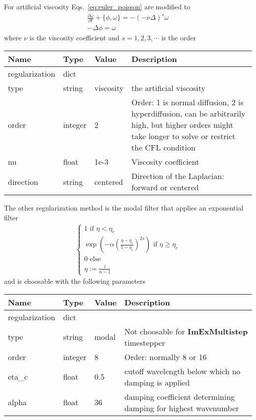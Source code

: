 For artificial viscosity Eqs.~\eqref{eq:euler_poisson} are modified to
\begin{subequations}
\begin{align}
    \frac{\partial \omega}{\partial t} + \{ \phi, \omega\} = -(-\nu \Delta)^s \omega\\
 -\Delta \phi = \omega
\end{align}
\label{eq:euler_poisson_viscous}
\end{subequations}
where $\nu$ is the viscosity coefficient and $s=1,2,3,\cdots$ is the order
\begin{longtable}{lllp{7.5cm}}
\toprule
\rowcolor{gray!50}\textbf{Name} &  \textbf{Type} & \textbf{Value}  & \textbf{Description}  \\ \midrule
regularization & dict & & \\
\qquad type  & string& viscosity & the artificial viscosity \\
\qquad order    & integer & 2 & Order: 1 is normal diffusion, 2 is hyperdiffusion, can be arbitrarily high, but higher orders might take longer to solve or restrict the CFL condition \\
\qquad nu    & float & 1e-3 & Viscosity coefficient \\
\qquad direction & string & centered & Direction of the Laplacian: forward or centered \\
\bottomrule
\end{longtable}
The other regularization method is the modal filter that applies an exponential filter
\begin{align}
    \begin{cases}
    1 \text{ if } \eta < \eta_c \\
    \exp\left( -\alpha  \left(\frac{\eta-\eta_c}{1-\eta_c} \right)^{2s}\right) \text { if } \eta \geq \eta_c \\
    0 \text{ else} \\
    \eta := \frac{i}{n-1}
    \end{cases}
\end{align}
and is choosable with the following parameters
\begin{longtable}{lllp{7.5cm}}
\toprule
\rowcolor{gray!50}\textbf{Name} &  \textbf{Type} & \textbf{Value}  & \textbf{Description}  \\ \midrule
regularization & dict & & \\
\qquad type  & string& modal & Not choosable for \textbf{ImExMultistep} timestepper\\
\qquad order & integer & 8 & Order: normally 8 or 16 \\
\qquad eta\_c & float & 0.5 & cutoff wavelength below which no damping is applied \\
\qquad alpha & float & 36 & damping coefficient determining damping for highest wavenumber \\
\bottomrule
\end{longtable}
